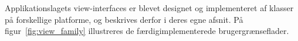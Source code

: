 Applikationslagets view-interfaces er blevet designet og implementeret af klasser på forskellige platforme, og beskrives derfor i deres egne afsnit. På figur~\ref{fig:view_family} illustreres de færdigimplementerede brugergrænseflader. 

